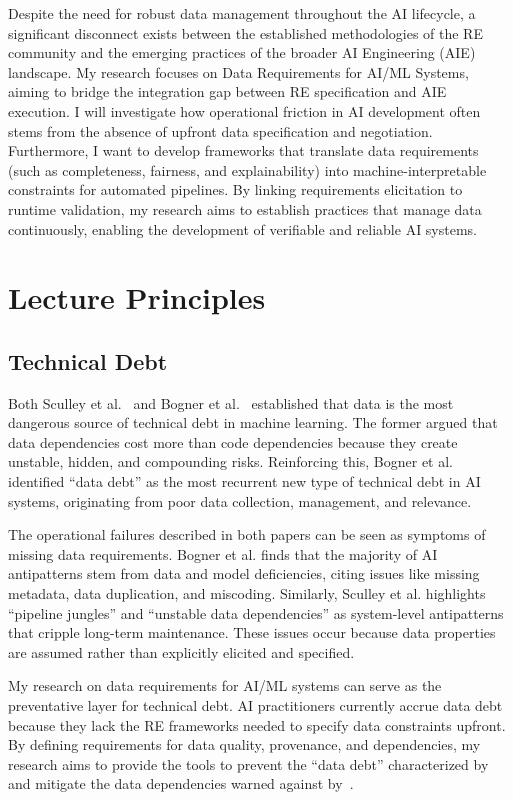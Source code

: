 Despite the need for robust data management throughout the AI lifecycle, a significant disconnect exists between the established methodologies of the RE community and the emerging practices of the broader AI Engineering (AIE) landscape. My research focuses on Data Requirements for AI/ML Systems, aiming to bridge the integration gap between RE specification and AIE execution. I will investigate how operational friction in AI development often stems from the absence of upfront data specification and negotiation. Furthermore, I want to develop frameworks that translate data requirements (such as completeness, fairness, and explainability) into machine-interpretable constraints for automated pipelines. By linking requirements elicitation to runtime validation, my research aims to establish practices that manage data continuously, enabling the development of verifiable and reliable AI systems.

\section{Lecture Principles}
\subsection{Technical Debt}
Both Sculley et al.~\cite{sculley2015hidden} and Bogner et al.~\cite{bogner2021characterizing} established that data is the most dangerous source of technical debt in machine learning. The former argued that data dependencies cost more than code dependencies because they create unstable, hidden, and compounding risks. Reinforcing this, Bogner et al. identified ``data debt'' as the most recurrent new type of technical debt in AI systems, originating from poor data collection, management, and relevance.

The operational failures described in both papers can be seen as symptoms of missing data requirements. Bogner et al. finds that the majority of AI antipatterns stem from data and model deficiencies, citing issues like missing metadata, data duplication, and miscoding. Similarly, Sculley et al. highlights ``pipeline jungles'' and ``unstable data dependencies'' as system-level antipatterns that cripple long-term maintenance. These issues occur because data properties are assumed rather than explicitly elicited and specified.

My research on data requirements for AI/ML systems can serve as the preventative layer for technical debt. AI practitioners currently accrue data debt because they lack the RE frameworks needed to specify data constraints upfront. By defining requirements for data quality, provenance, and dependencies, my research aims to provide the tools to prevent the ``data debt'' characterized by~\cite{bogner2021characterizing} and mitigate the data dependencies warned against by~\cite{sculley2015hidden}.

